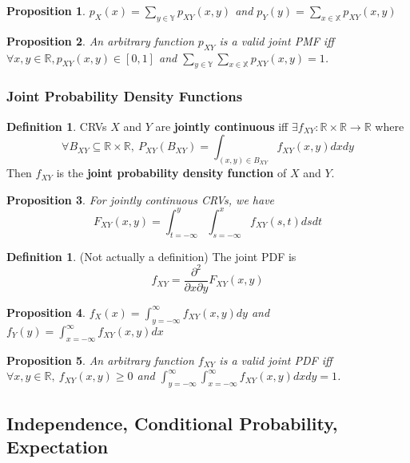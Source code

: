 \documentclass[12pt]{article}
\newtheorem*{prop*}{Proposition}
\theoremstyle{definition}
\newtheorem{defn}{Definition}[subsection]
\newtheorem*{defn*}{Definition}
\newcommand{\R}{\mathbb{R}}
\newcommand{\X}{\mathbb{X}}
\newcommand{\Y}{\mathbb{Y}}
\begin{document}
\begin{prop*}
  $p_X(x) = \sum_{y \in \Y}p_{XY}(x, y)$ and $p_Y(y) = \sum_{x \in \X}p_{XY}(x, y)$
\end{prop*}

\begin{prop*}
  An arbitrary function $p_{XY}$ is a valid joint PMF iff $\forall x, y \in \R, p_{XY}(x, y) \in [0, 1]$ and $\sum_{y \in \Y}\sum_{x \in \X}p_{XY}(x, y) = 1$.
\end{prop*}

\subsubsection{Joint Probability Density Functions}

\begin{defn*}
  CRVs $X$ and $Y$ are \textbf{jointly continuous} iff $\exists f_{XY} : \R \times \R \to \R$ where
  $$\forall B_{XY} \subseteq \R \times \R,\ P_{XY}(B_{XY}) = \int_{(x, y) \in B_{XY}}f_{XY}(x, y)dxdy$$
  Then $f_{XY}$ is the \textbf{joint probability density function} of $X$ and $Y$.
\end{defn*}

\begin{prop*}
  For jointly continuous CRVs, we have
  $$F_{XY}(x, y) = \int_{t = -\infty}^y\int_{s = -\infty}^xf_{XY}(s, t)dsdt$$
\end{prop*}

\begin{defn}
  (Not actually a definition)
  The joint PDF is
  $$f_{XY} = \frac{\partial^2}{\partial x\partial y}F_{XY}(x, y)$$
\end{defn}

\begin{prop*}
  $f_X(x) = \int_{y = -\infty}^{\infty}f_{XY}(x, y)dy$ and $f_Y(y) = \int_{x = -\infty}^{\infty}f_{XY}(x, y)dx$
\end{prop*}

\begin{prop*}
  An arbitrary function $f_{XY}$ is a valid joint PDF iff $\forall x, y \in \R,\ f_{XY}(x, y) \geq 0$ and $\int_{y = -\infty}^{\infty}\int_{x = -\infty}^{\infty}f_{XY}(x, y)dxdy = 1$.
\end{prop*}

\subsection{Independence, Conditional Probability, Expectation}
\end{document}
